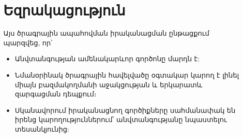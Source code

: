 \documentclass[11pt]{article}
\begin{document}
\begin{sloppypar}
\newpage
\section{Եզրակացություն}

Այս ծրագրային ապահովման իրականացման ընթացքում պարզվեց, որ՝

\begin{itemize}
\item Անվտանգության ամենակարևոր գործոնը մարդն է:
\item Նմանօրինակ ծրագրային հավելվածը օգտակար կարող է
    լինել միայն բազմակողմանի աջակցության և երկարատև զարգացման
    դեպքում։
\item Սկանավորում իրականացնող գործիքները սահմանափակ են
    իրենց կարողություններում՝ անվտանգությանը նպաստելու
    տեսանկյունից:
\end{itemize}




\newpage

\end{sloppypar}
\end{document}
